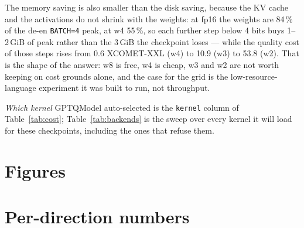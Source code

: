 \documentclass[10pt]{article}
\begin{document}
The memory saving is also smaller than the disk saving, because the KV cache and the activations do
not shrink with the weights: at fp16 the weights are 84\,\% of the de-en \texttt{BATCH=4} peak, at w4
55\,\%, so each further step below 4 bits buys 1--2\,GiB of peak rather than the 3\,GiB the
checkpoint loses --- while the quality cost of those steps rises from 0.6 XCOMET-XXL (w4) to 10.9
(w3) to 53.8 (w2). That is the shape of the answer: w8 is free, w4 is cheap, w3 and w2 are not worth
keeping on cost grounds alone, and the case for the grid is the low-resource-language experiment it
was built to run, not throughput.

\emph{Which kernel} GPTQModel auto-selected is the \texttt{kernel} column of
Table~\ref{tab:cost}; Table~\ref{tab:backends} is the sweep over every kernel it will load for
these checkpoints, including the ones that refuse them.





\clearpage
\section*{Figures}


\clearpage
\section*{Per-direction numbers}

\end{document}
